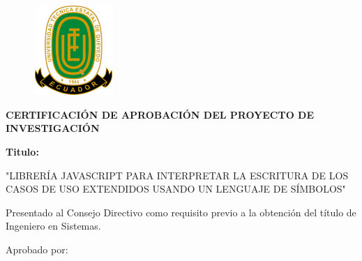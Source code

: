 \begin{center}
		\begin{figure}[htb]
		\begin{center}
			\includegraphics[width=3.04cm,height=3.39cm]{img/logoUTEQ.png}
		\end{center}
	\end{figure}

{\titulodc \textbf{CERTIFICACIÓN DE APROBACIÓN DEL PROYECTO DE INVESTIGACIÓN}}

\vspace*{0.5in}
\textbf{Titulo:}
\vspace*{0.3in}

"LIBRERÍA JAVASCRIPT PARA INTERPRETAR LA ESCRITURA DE LOS CASOS DE USO EXTENDIDOS USANDO UN LENGUAJE DE SÍMBOLOS"

\end{center}

Presentado al Consejo Directivo como requisito previo a la obtención del título de Ingeniero en Sistemas. 

Aprobado por: